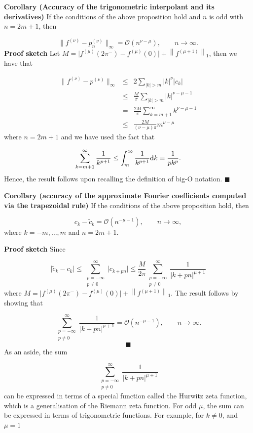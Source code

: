 \documentclass[12pt,landscape]{article}
\begin{document}
{\textbf{Corollary (Accuracy of the trigonometric interpolant and its derivatives)}  If the conditions of the above proposition hold and $n$ is odd with $n = 2m + 1$, then

\[
\| f^{(\nu)} - p_n^{(\nu)} \|_{\infty} = \mathcal{O}(n^{\nu-\mu}), \qquad n \to \infty.
\]
\textbf{Proof sketch} Let $M  = \vert f^{(\mu)}(2\pi^{-}) - f^{(\mu)}(0)   \vert + \left\|f^{(\mu+1)}   \right\|_1$, then we have that


\begin{eqnarray*}
\| f^{(\nu)} - p^{(\nu)}  \|_{\infty} & \leq  & 2\sum_{\vert k \vert > m} \vert k \vert^{\nu} \vert c_k \vert  \\
& \leq & \frac{M}{\pi } \sum_{\vert k \vert > m} \vert k \vert^{\nu-\mu-1} \\
& = & \frac{2M}{\pi } \sum_{ k = m+1}^{\infty}  k^{\nu-\mu-1} \\
& \leq & \frac{2M}{(\nu-\mu)\pi  } m^{\nu-\mu}
\end{eqnarray*}
where $n = 2m + 1$ and we have used the fact that

\[
\sum_{k = m+1}^{\infty}  \frac{1}{k^{p+1}}  \leq \int_{m}^{\infty} \frac{1}{k^{p+1}}{\rm d}k = \frac{1}{pk^p}.
\]
Hence, the result follows upon recalling the definition of big-O notation.   $\blacksquare$

\textbf{Corollary (accuracy of the approximate Fourier coefficients computed via the trapezoidal rule)} If the conditions of the above proposition hold, then

\[
c_k - \widetilde{c}_{k} = \mathcal{O}\left( n^{-\mu-1} \right), \qquad n \to \infty,
\]
where $k = -m, \ldots, m$ and $n = 2m + 1$.

\textbf{Proof sketch} Since

\[
\vert \widetilde{c}_k - c_k \vert \leq  \sum_{\substack{p=-\infty\\ p\neq 0}}^{\infty} \vert c_{k+pn} \vert \leq  \frac{M}{2\pi} \sum_{\substack{p=-\infty\\ p\neq 0}}^{\infty}  \frac{1}{\vert k + pn \vert^{\mu+1}}
\]
where $M  = \vert f^{(\mu)}(2\pi^{-}) - f^{(\mu)}(0)   \vert + \left\|f^{(\mu+1)}   \right\|_1$.  The result follows by showing that

\[
\sum_{\substack{p=-\infty\\ p\neq 0}}^{\infty}  \frac{1}{\vert k + pn \vert^{\mu+1}} = \mathcal{O}(n^{-\mu-1}), \qquad n \to \infty.
\]
\[
\blacksquare
\]
As an aside, the sum 

\[
\sum_{\substack{p=-\infty\\ p\neq 0}}^{\infty}  \frac{1}{\vert k + pn \vert^{\mu+1}}
\]
can be expressed in terms of a special function called the Hurwitz zeta function, which is a generalisation of the Riemann zeta function.  For odd $\mu$, the sum can be expressed in terms of trigonometric functions.  For example, for $k \neq 0$, and $\mu = 1$

}
\end{document}
